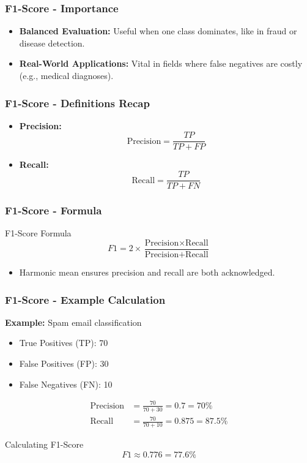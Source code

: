 \documentclass[aspectratio=169]{beamer}
\begin{document}
\begin{frame}[fragile]
    \frametitle{F1-Score - Importance}
    \begin{itemize}
        \item \textbf{Balanced Evaluation:} Useful when one class dominates, like in fraud or disease detection.
        \item \textbf{Real-World Applications:} Vital in fields where false negatives are costly (e.g., medical diagnoses).
    \end{itemize}
\end{frame}

\begin{frame}[fragile]
    \frametitle{F1-Score - Definitions Recap}
    \begin{itemize}
        \item \textbf{Precision:} 
        \[
        \text{Precision} = \frac{TP}{TP + FP}
        \]
        \item \textbf{Recall:} 
        \[
        \text{Recall} = \frac{TP}{TP + FN}
        \]
    \end{itemize}
\end{frame}

\begin{frame}[fragile]
    \frametitle{F1-Score - Formula}
    \begin{block}{F1-Score Formula}
        \[
        F1 = 2 \times \frac{\text{Precision} \times \text{Recall}}{\text{Precision} + \text{Recall}}
        \]
        \begin{itemize}
            \item Harmonic mean ensures precision and recall are both acknowledged.
        \end{itemize}
    \end{block}
\end{frame}

\begin{frame}[fragile]
    \frametitle{F1-Score - Example Calculation}
    \textbf{Example:} Spam email classification
    \begin{itemize}
        \item True Positives (TP): 70
        \item False Positives (FP): 30
        \item False Negatives (FN): 10
    \end{itemize}
    \begin{align*}
        \text{Precision} &= \frac{70}{70 + 30} = 0.7 = 70\% \\
        \text{Recall} &= \frac{70}{70 + 10} = 0.875 = 87.5\%
    \end{align*}
    \begin{block}{Calculating F1-Score}
        \[
        F1 \approx 0.776 = 77.6\%
        \]
    \end{block}
\end{frame}
\end{document}
